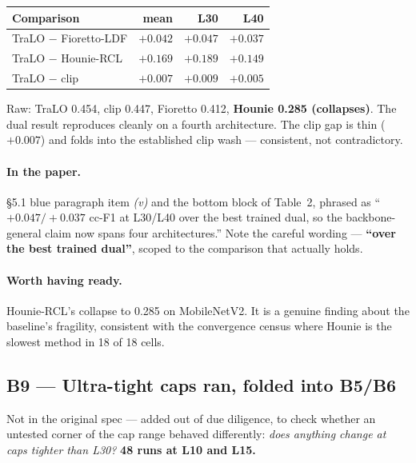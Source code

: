 \documentclass[11pt,a4paper]{article}
\begin{document}
\begin{center}
\begin{tabular}{@{}l r r r@{}}
\toprule
\textbf{Comparison} & \textbf{mean} & \textbf{L30} & \textbf{L40} \\
\midrule
TraLO $-$ Fioretto-LDF & $\mathbf{+0.042}$ & $+0.047$ & $+0.037$ \\
TraLO $-$ Hounie-RCL   & $+0.169$ & $+0.189$ & $+0.149$ \\
TraLO $-$ clip         & $+0.007$ & $+0.009$ & $+0.005$ \\
\bottomrule
\end{tabular}
\end{center}

Raw: TraLO 0.454, clip 0.447, Fioretto 0.412, \textbf{Hounie 0.285 (collapses)}. The dual result
reproduces cleanly on a fourth architecture. The clip gap is thin ($+0.007$) and folds into the
established clip wash --- consistent, not contradictory.

\paragraph{In the paper.} \S5.1 blue paragraph item \emph{(v)} and the bottom block of Table~2,
phrased as ``$+0.047/+0.037$ cc-F1 at L30/L40 over the best trained dual, so the backbone-general
claim now spans four architectures.'' Note the careful wording --- \textbf{``over the best trained
dual''}, scoped to the comparison that actually holds.

\paragraph{Worth having ready.} Hounie-RCL's collapse to 0.285 on MobileNetV2. It is a genuine
finding about the baseline's fragility, consistent with the convergence census where Hounie is the
slowest method in 18 of 18 cells.

\subsection*{B9 --- Ultra-tight caps
\hfill\normalsize\textcolor{warnred}{\textbf{ran, folded into B5/B6}}}

Not in the original spec --- added out of due diligence, to check whether an untested corner of the
cap range behaved differently: \emph{does anything change at caps tighter than L30?}
\textbf{48 runs at L10 and L15.}
\end{document}
